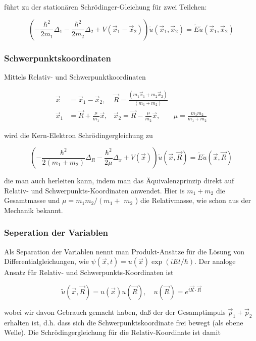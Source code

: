 \documentclass[10pt, letterpaper]{article}
\begin{document}
führt zu der stationären Schrödinger-Gleichung für zwei Teilchen:

$$
\left(-\frac{\hbar^{2}}{2 m_{1}} \Delta_{1}-\frac{\hbar^{2}}{2 m_{2}} \Delta_{2}+V\left(\vec{x}_{1}-\vec{x}_{2}\right)\right) \tilde{u}\left(\vec{x}_{1}, \vec{x}_{2}\right)=\tilde{E} \tilde{u}\left(\vec{x}_{1}, \vec{x}_{2}\right)
$$

\subsubsection*{Schwerpunktskoordinaten}
Mittels Relativ- und Schwerpunktkoordinaten

$$
\begin{aligned}
\vec{x} & =\vec{x}_{1}-\vec{x}_{2}, & \vec{R}=\frac{\left(m_{1} \vec{x}_{1}+m_{2} \vec{x}_{2}\right)}{\left(m_{1}+m_{2}\right)} & \\
\vec{x}_{1} & =\vec{R}+\frac{\mu}{m_{1}} \vec{x}, & \vec{x}_{2}=\vec{R}-\frac{\mu}{m_{2}} \vec{x}, & \mu=\frac{m_{1} m_{2}}{m_{1}+m_{2}}
\end{aligned}
$$

wird die Kern-Elektron Schrödingergleichung zu

$$
\left(-\frac{\hbar^{2}}{2\left(m_{1}+m_{2}\right)} \Delta_{R}-\frac{\hbar^{2}}{2 \mu} \Delta_{x}+V(\vec{x})\right) \tilde{u}(\vec{x}, \vec{R})=\tilde{E} \tilde{u}(\vec{x}, \vec{R})
$$

die man auch herleiten kann, indem man das Äquivalenzprinzip direkt auf Relativ- und Schwerpunkts-Koordinaten anwendet. Hier is $m_{1}+m_{2}$ die Gesamtmasse und $\mu=m_{1} m_{2} /\left(m_{1}+\right.$ $m_{2}$ ) die Relativmasse, wie schon aus der Mechanik bekannt.

\subsubsection*{Seperation der Variablen}
Als Separation der Variablen nennt man Produkt-Ansätze für die Lösung von Differentialgleichungen, wie $\psi(\vec{x}, t)=u(\vec{x}) \exp (i E t / \hbar)$. Der analoge Ansatz für Relativ- und Schwerpunkts-Koordinaten ist

$$
\tilde{u}(\vec{x}, \vec{R})=u(\vec{x}) u(\vec{R}), \quad u(\vec{R})=e^{i \vec{K} \cdot \vec{R}}
$$

wobei wir davon Gebrauch gemacht haben, daß der der Gesamptimpuls $\vec{p}_{1}+\vec{p}_{2}$ erhalten ist, d.h. dass sich die Schwerpunktskoordinate frei bewegt (als ebene Welle). Die Schrödingergleichung für die Relativ-Koordinate ist damit
\end{document}
